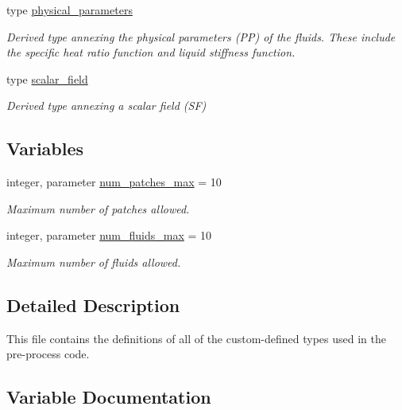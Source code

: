 \begin{DoxyCompactItemize}
type \hyperlink{structm__derived__types_1_1physical__parameters}{physical\+\_\+parameters}
\begin{DoxyCompactList}\small\item\em Derived type annexing the physical parameters (PP) of the fluids. These include the specific heat ratio function and liquid stiffness function. \end{DoxyCompactList}\item 
type \hyperlink{structm__derived__types_1_1scalar__field}{scalar\+\_\+field}
\begin{DoxyCompactList}\small\item\em Derived type annexing a scalar field (SF) \end{DoxyCompactList}\end{DoxyCompactItemize}
\subsection*{Variables}
\begin{DoxyCompactItemize}
\item 
integer, parameter \hyperlink{namespacem__derived__types_a0e61503f10c4338737b8d61e9109e396}{num\+\_\+patches\+\_\+max} = 10
\begin{DoxyCompactList}\small\item\em Maximum number of patches allowed. \end{DoxyCompactList}\item 
integer, parameter \hyperlink{namespacem__derived__types_a3dde07670ef3e164534aa68c1830ff62}{num\+\_\+fluids\+\_\+max} = 10
\begin{DoxyCompactList}\small\item\em Maximum number of fluids allowed. \end{DoxyCompactList}\end{DoxyCompactItemize}


\subsection{Detailed Description}
This file contains the definitions of all of the custom-\/defined types used in the pre-\/process code. 

\subsection{Variable Documentation}
\mbox{\label{namespacem__derived__types_a3dde07670ef3e164534aa68c1830ff62}} 
